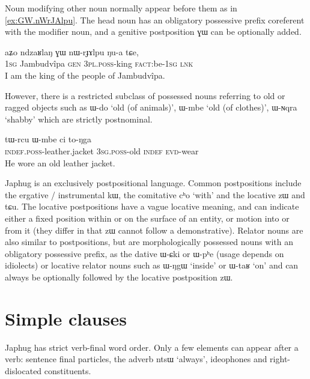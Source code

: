 \documentclass[oldfontcommands,oneside,a4paper,11pt]{article}
\newcommand{\ipa}[1]{{\phon #1}} %
\begin{document}
Noun modifying other noun normally appear before them as in \ref{ex:GW.nWrJAlpu}. The head noun has an obligatory possessive prefix coreferent with the modifier noun, and a genitive postposition \ipa{ɣɯ} can be optionally added.

\begin{exe}
\ex \label{ex:GW.nWrJAlpu}
\gll
\ipa{aʑo}  	\ipa{ndzaʁlaŋ}  	\ipa{ɣɯ}  	\ipa{nɯ-rɟɤlpu}  	\ipa{ŋu-a}  	\ipa{tɕe,}  
 \\
\textsc{1sg} Jambudvîpa \textsc{gen} \textsc{3pl.poss}-king \textsc{fact}:be-\textsc{1sg} \textsc{lnk} \\
\glt I am the king of the people of Jambudvîpa.
\end{exe}

However, there is a  restricted subclass of possessed nouns referring to old or ragged objects such as \ipa{ɯ-do} `old (of animals)', \ipa{ɯ-mbe} `old (of clothes)', \ipa{ɯ-ɴqra} `shabby' which are strictly postnominal.


\begin{exe}
\ex \label{ex:Wmbe}
\gll
\ipa{tɯ-rcu} 	\ipa{ɯ-mbe} 	\ipa{ci} 	\ipa{to-ŋga} \\
\textsc{indef.poss}-leather.jacket \textsc{3sg.poss}-old \textsc{indef} \textsc{evd}-wear \\
\glt He wore an old leather jacket.
\end{exe}

Japhug is an exclusively postpositional language. Common postpositions include the ergative / instrumental \ipa{kɯ}, the comitative \ipa{cʰo} `with' and the locative \ipa{zɯ} and \ipa{tɕu}. The locative postpositions have a vague locative meaning, and can indicate either a fixed position within or on the surface of an entity, or motion into or from it (they differ in that \ipa{zɯ} cannot follow a demonstrative). Relator nouns are also similar to postpositions, but are morphologically possessed nouns with an obligatory possessive prefix, as the dative \ipa{ɯ-ɕki} or \ipa{ɯ-pʰe} (usage depends on  idiolects) or locative relator nouns such as \ipa{ɯ-ŋgɯ} `inside' or \ipa{ɯ-taʁ} `on' and can always be optionally followed by the locative postposition \ipa{zɯ}.

\section{Simple clauses} 

Japhug has strict verb-final word order. Only a few elements can appear after a verb: sentence final particles, the adverb \ipa{ntsɯ} `always', ideophones and right-dislocated constituents.
\end{document}
